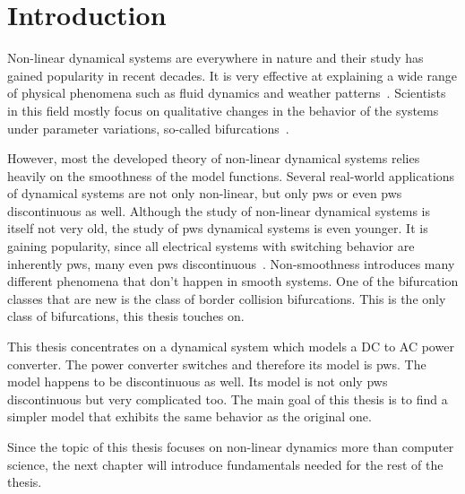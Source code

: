 \chapter{Introduction}
\label{chap:intro}

Non-linear dynamical systems are everywhere in nature and their study has gained popularity in recent decades.
It is very effective at explaining a wide range of physical phenomena such as fluid dynamics and weather patterns~\cite{bernardo2008piecewise}.
Scientists in this field mostly focus on qualitative changes in the behavior of the systems under parameter variations, so-called bifurcations~\cite{simpson2010}.

However, most the developed theory of non-linear dynamical systems relies heavily on the smoothness of the model functions.
Several real-world applications of dynamical systems are not only non-linear, but only \gls{pws} or even \gls{pws} discontinuous as well.
Although the study of non-linear dynamical systems is itself not very old, the study of \gls{pws} dynamical systems is even younger.
It is gaining popularity, since all electrical systems with switching behavior are inherently \gls{pws}, many even \gls{pws} discontinuous~\cite{simpson2010}.
Non-smoothness introduces many different phenomena that don't happen in smooth systems.
One of the bifurcation classes that are new is the class of border collision bifurcations.
This is the only class of bifurcations, this thesis touches on.

This thesis concentrates on a dynamical system which models a DC to AC power converter.
The power converter switches and therefore its model is \gls{pws}.
The model happens to be discontinuous as well.
Its model is not only \gls{pws} discontinuous but very complicated too.
The main goal of this thesis is to find a simpler model that exhibits the same behavior as the original one.

Since the topic of this thesis focuses on non-linear dynamics more than computer science, the next chapter will introduce fundamentals needed for the rest of the thesis.
